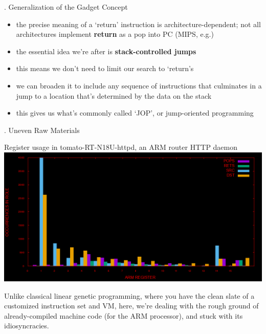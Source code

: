 \documentclass[9pt]{beamer}
\begin{document}
\begin{frame}{\theframenumber. Generalization of the Gadget Concept}
  \begin{itemize}
  \item the precise meaning of a `return' instruction is architecture-dependent; not all architectures implement \textbf{return} as a pop into PC (MIPS, e.g.)
    
  \item the essential idea we're after is \textbf{stack-controlled jumps}
  \item this means we don't need to limit our search to `return's
  \item we can broaden it to include any sequence of instructions that culminates in a jump to a location that's determined by the data on the stack
  \item this gives us what's commonly called `JOP', or jump-oriented programming
  \end{itemize}
  
  
\end{frame}



\begin{frame}{\theframenumber. Uneven Raw Materials}

  \begin{center}
    Register usage in tomato-RT-N18U-httpd, an ARM router HTTP daemon
    \includegraphics[width=\textwidth]{../images/tomato.png}
    \end{center}
  Unlike classical linear genetic programming, where you have the clean slate of a customized instruction set and VM, here, we're dealing with the rough ground of already-compiled machine code (for the ARM processor), and stuck with its idiosyncracies.

\end{frame}
\end{document}
